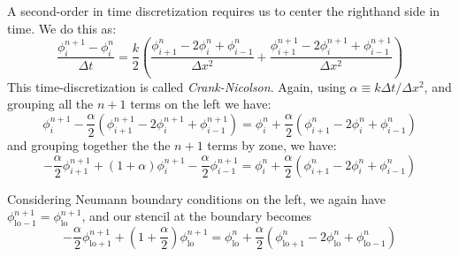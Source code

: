 A second-order in time discretization requires us to center the righthand side in time.  We
do this as:
\begin{equation}
\frac{\phi_i^{n+1} - \phi_i^n}{\Delta t} = 
  \frac{k}{2} \left ( \frac{\phi_{i+1}^{n} - 2\phi_i^{n} + \phi_{i-1}^{n}}{\Delta x^2} +
                      \frac{\phi_{i+1}^{n+1} - 2\phi_i^{n+1} + \phi_{i-1}^{n+1}}{\Delta x^2} \right )
\end{equation}
This time-discretization is called  {\em Crank-Nicolson}.
Again, using $\alpha \equiv k\Delta t / \Delta x^2$, and grouping all the $n+1$ terms on the left
we have:
\begin{equation}
\phi^{n+1}_i - \frac{\alpha}{2} \left ( \phi^{n+1}_{i+1} - 2\phi^{n+1}_i + \phi^{n+1}_{i-1} \right )
  = \phi^n_i + \frac{\alpha}{2} \left ( \phi^{n}_{i+1} - 2\phi^{n}_i + \phi^{n}_{i-1} \right )
\end{equation}
and grouping together the the $n+1$ terms by zone, we have:
\begin{equation}
-\frac{\alpha}{2} \phi^{n+1}_{i+1} + (1 + \alpha)\phi^{n+1}_i - \frac{\alpha}{2} \phi^{n+1}_{i-1}
  = \phi^n_i + \frac{\alpha}{2} \left ( \phi^n_{i+1} - 2 \phi^n_i + \phi^n_{i-1} \right )
\end{equation}

Considering Neumann boundary conditions on the left, we again have
$\phi^{n+1}_\mathrm{lo-1} = \phi^{n+1}_\mathrm{lo}$, and our stencil at the boundary 
becomes
\begin{equation}
-\frac{\alpha}{2} \phi^{n+1}_\mathrm{lo+1} + \left (1 + \frac{\alpha}{2} \right ) \phi^{n+1}_\mathrm{lo} =
    \phi^n_\mathrm{lo} + \frac{\alpha}{2} \left ( \phi^{n}_\mathrm{lo+1} - 2\phi^{n}_\mathrm{lo} + \phi^{n}_\mathrm{lo-1} \right )
\end{equation}

